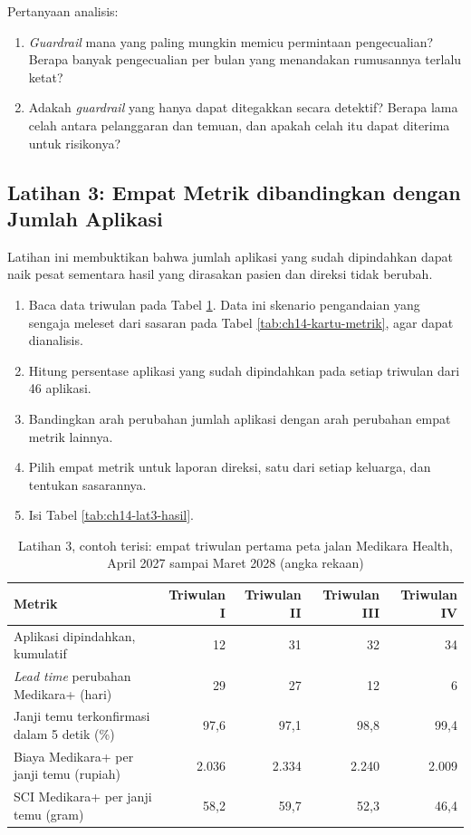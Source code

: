 Pertanyaan analisis:
\begin{enumerate}
  \item \textit{Guardrail} mana yang paling mungkin memicu permintaan pengecualian? Berapa banyak
        pengecualian per bulan yang menandakan rumusannya terlalu ketat?
  \item Adakah \textit{guardrail} yang hanya dapat ditegakkan secara detektif? Berapa lama celah
        antara pelanggaran dan temuan, dan apakah celah itu dapat diterima untuk risikonya?
\end{enumerate}

\subsection*{Latihan 3: Empat Metrik dibandingkan dengan Jumlah Aplikasi}

Latihan ini membuktikan bahwa jumlah aplikasi yang sudah dipindahkan dapat naik pesat sementara
hasil yang dirasakan pasien dan direksi tidak berubah.

\begin{enumerate}
  \item Baca data triwulan pada Tabel \ref{tab:ch14-lat3-contoh}. Data ini skenario pengandaian yang
        sengaja meleset dari sasaran pada Tabel \ref{tab:ch14-kartu-metrik}, agar dapat dianalisis.
  \item Hitung persentase aplikasi yang sudah dipindahkan pada setiap triwulan dari 46 aplikasi.
  \item Bandingkan arah perubahan jumlah aplikasi dengan arah perubahan empat metrik lainnya.
  \item Pilih empat metrik untuk laporan direksi, satu dari setiap keluarga, dan tentukan sasarannya.
  \item Isi Tabel \ref{tab:ch14-lat3-hasil}.
\end{enumerate}

\begin{table}[!htb]
  \centering
  \caption{Latihan 3, contoh terisi: empat triwulan pertama peta jalan Medikara Health, April 2027
           sampai Maret 2028 (angka rekaan)}
  \label{tab:ch14-lat3-contoh}
  \footnotesize
  \begin{tabularx}{\textwidth}{>{\raggedright\arraybackslash}X r r r r}
    \hline
    \textbf{Metrik} & \textbf{Triwulan I} & \textbf{Triwulan II} & \textbf{Triwulan III} &
      \textbf{Triwulan IV} \\ \hline
    Aplikasi dipindahkan, kumulatif & 12 & 31 & 32 & 34 \\ \hline
    \textit{Lead time} perubahan Medikara+ (hari) & 29 & 27 & 12 & 6 \\ \hline
    Janji temu terkonfirmasi dalam 5 detik (\%) & 97,6 & 97,1 & 98,8 & 99,4 \\ \hline
    Biaya Medikara+ per janji temu (rupiah) & 2.036 & 2.334 & 2.240 & 2.009 \\ \hline
    SCI Medikara+ per janji temu (gram) & 58,2 & 59,7 & 52,3 & 46,4 \\ \hline
  \end{tabularx}
\end{table}

